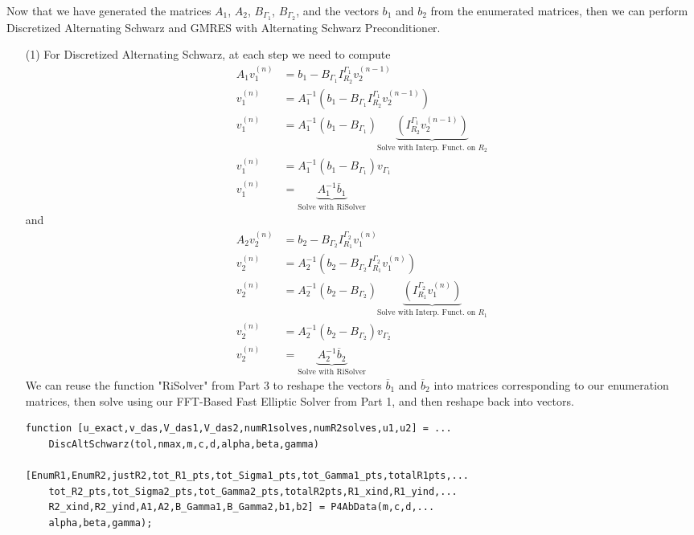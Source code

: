\documentclass[12pt]{article}
\begin{document}
Now that we have generated the matrices $A_1$, $A_2$, $B_{\Gamma_1}$, $B_{\Gamma_2}$, and the vectors $b_1$ and $b_2$ from the enumerated matrices, then we can perform Discretized Alternating Schwarz and GMRES with Alternating Schwarz Preconditioner.

\begin{itemize}
\item[(1)] For Discretized Alternating Schwarz, at each step we need to compute
\begin{align*}
A_1v_1^{(n)} &= b_1 - B_{\Gamma_1}I_{R_2}^{\Gamma_1}v_2^{(n-1)} \\
v_1^{(n)} &= A_1^{-1}\left(b_1 - B_{\Gamma_1}I_{R_2}^{\Gamma_1}v_2^{(n-1)} \right) \\
v_1^{(n)} &= A_1^{-1}\left(b_1 - B_{\Gamma_1}\right)\underbrace{\left(I_{R_2}^{\Gamma_1}v_2^{(n-1)} \right)}_{\text{Solve with Interp. Funct. on $R_2$}} \\
v_1^{(n)} &= A_1^{-1}\left(b_1 - B_{\Gamma_1}\right)v_{\Gamma_1} \\
v_1^{(n)} &= \underbrace{A_1^{-1}\overline{b}_1}_{\text{Solve with RiSolver}}
\end{align*}
and
\begin{align*}
A_2v_2^{(n)} &= b_2 - B_{\Gamma_2}I_{R_1}^{\Gamma_2}v_1^{(n)} \\
v_2^{(n)} &= A_2^{-1}\left(b_2 - B_{\Gamma_2}I_{R_1}^{\Gamma_2}v_1^{(n)} \right) \\
v_2^{(n)} &= A_2^{-1}\left(b_2 - B_{\Gamma_2}\right)\underbrace{\left(I_{R_1}^{\Gamma_2}v_1^{(n)} \right)}_{\text{Solve with Interp. Funct. on $R_1$}} \\
v_2^{(n)} &= A_2^{-1}\left(b_2 - B_{\Gamma_2}\right)v_{\Gamma_2} \\
v_2^{(n)} &= \underbrace{A_2^{-1}\overline{b}_2}_{\text{Solve with RiSolver}}
\end{align*}
We can reuse the function "RiSolver" from Part 3 to reshape the vectors $\overline{b}_1$ and $\overline{b}_2$ into matrices corresponding to our enumeration matrices, then solve using our FFT-Based Fast Elliptic Solver from Part 1, and then reshape back into vectors.\\

\lstset{language=matlab,frame=single}
\begin{lstlisting}[caption=Discretized Alternating Schwarz]
function [u_exact,v_das,V_das1,V_das2,numR1solves,numR2solves,u1,u2] = ...
    DiscAltSchwarz(tol,nmax,m,c,d,alpha,beta,gamma)

[EnumR1,EnumR2,justR2,tot_R1_pts,tot_Sigma1_pts,tot_Gamma1_pts,totalR1pts,...
    tot_R2_pts,tot_Sigma2_pts,tot_Gamma2_pts,totalR2pts,R1_xind,R1_yind,...
    R2_xind,R2_yind,A1,A2,B_Gamma1,B_Gamma2,b1,b2] = P4AbData(m,c,d,...
    alpha,beta,gamma);


\end{lstlisting}
\end{itemize}
\end{document}

